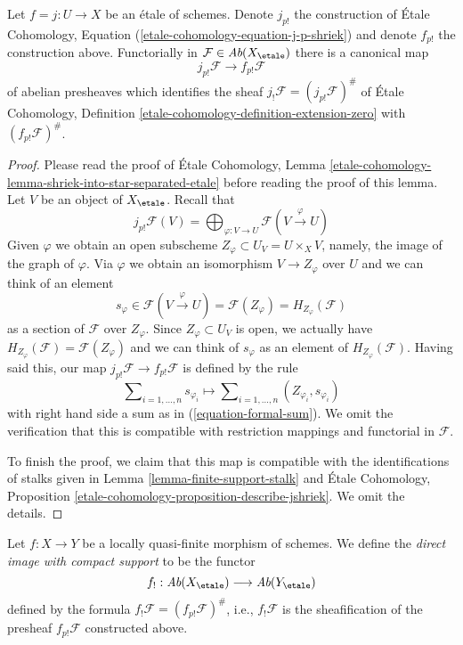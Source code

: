 \begin{lemma}
\label{lemma-finite-support-etale-shriek}
Let $f = j : U \to X$ be an \'etale of schemes. Denote $j_{p!}$
the construction of \'Etale Cohomology, Equation
(\ref{etale-cohomology-equation-j-p-shriek})
and denote $f_{p!}$ the construction above. Functorially in
$\mathcal{F} \in \textit{Ab}(X_\etale)$ there is a canonical map
$$
j_{p!}\mathcal{F} \longrightarrow f_{p!}\mathcal{F}
$$
of abelian presheaves which identifies the sheaf
$j_!\mathcal{F} = (j_{p!}\mathcal{F})^\#$ of \'Etale Cohomology,
Definition \ref{etale-cohomology-definition-extension-zero}
with $(f_{p!}\mathcal{F})^\#$.
\end{lemma}

\begin{proof}
Please read the proof of \'Etale Cohomology, Lemma
\ref{etale-cohomology-lemma-shriek-into-star-separated-etale}
before reading the proof of this lemma.
Let $V$ be an object of $X_\etale$. Recall that
$$
j_{p!}\mathcal{F}(V) =
\bigoplus\nolimits_{\varphi : V \to U} \mathcal{F}(V \xrightarrow{\varphi} U)
$$
Given $\varphi$ we obtain an open subscheme
$Z_\varphi \subset U_V = U \times_X V$, namely,
the image of the graph of $\varphi$. Via $\varphi$
we obtain an isomorphism $V \to Z_\varphi$ over $U$
and we can think of an element
$$
s_\varphi \in \mathcal{F}(V \xrightarrow{\varphi} U) =
\mathcal{F}(Z_\varphi) = H_{Z_\varphi}(\mathcal{F})
$$
as a section of $\mathcal{F}$ over $Z_{\varphi}$. Since
$Z_\varphi \subset U_V$ is open, we actually have
$H_{Z_\varphi}(\mathcal{F}) = \mathcal{F}(Z_\varphi)$
and we can think of $s_\varphi$ as an element of $H_{Z_\varphi}(\mathcal{F})$.
Having said this, our map $j_{p!}\mathcal{F} \to f_{p!}\mathcal{F}$
is defined by the rule
$$
\sum\nolimits_{i = 1, \ldots, n} s_{\varphi_i}
\longmapsto
\sum\nolimits_{i = 1, \ldots, n} (Z_{\varphi_i}, s_{\varphi_i})
$$
with right hand side a sum as in (\ref{equation-formal-sum}).
We omit the verification that this is compatible with restriction
mappings and functorial in $\mathcal{F}$.

\medskip\noindent
To finish the proof, we claim that this map is compatible with the
identifications of stalks given in
Lemma \ref{lemma-finite-support-stalk} and
\'Etale Cohomology, Proposition
\ref{etale-cohomology-proposition-describe-jshriek}.
We omit the details.
\end{proof}

\begin{definition}
\label{definition-f-shriek-lqf}
Let $f : X \to Y$ be a locally quasi-finite morphism of schemes.
We define the {\it direct image with compact support} to be the
functor
$$
f_! : \textit{Ab}(X_\etale) \longrightarrow \textit{Ab}(Y_\etale)
$$
defined by the formula $f_!\mathcal{F} = (f_{p!}\mathcal{F})^\#$,
i.e., $f_!\mathcal{F}$ is the sheafification of the presheaf
$f_{p!}\mathcal{F}$ constructed above.
\end{definition}

